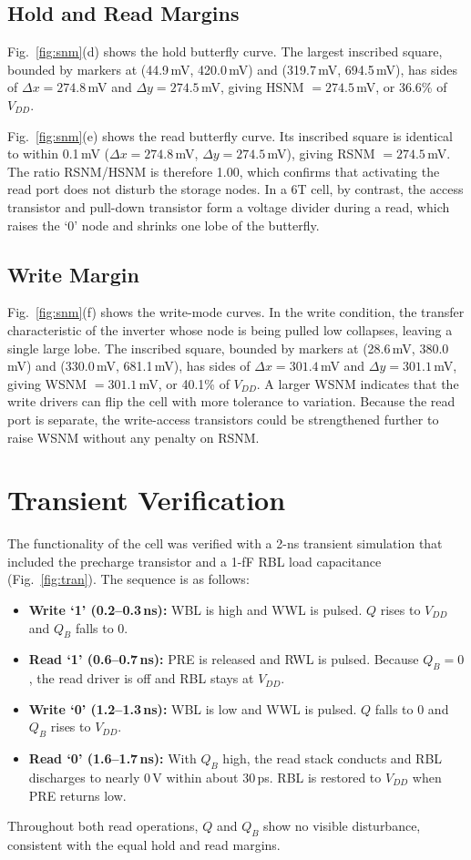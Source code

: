 \documentclass[conference]{IEEEtran}
\begin{document}
\subsection{Hold and Read Margins}
Fig.~\ref{fig:snm}(d) shows the hold butterfly curve. The largest inscribed square, bounded by markers at (44.9\,mV, 420.0\,mV) and (319.7\,mV, 694.5\,mV), has sides of $\Delta x = 274.8$\,mV and $\Delta y = 274.5$\,mV, giving HSNM $=274.5$\,mV, or 36.6\% of $V_{DD}$.

Fig.~\ref{fig:snm}(e) shows the read butterfly curve. Its inscribed square is identical to within 0.1\,mV ($\Delta x = 274.8$\,mV, $\Delta y = 274.5$\,mV), giving RSNM $=274.5$\,mV. The ratio RSNM/HSNM is therefore 1.00, which confirms that activating the read port does not disturb the storage nodes. In a 6T cell, by contrast, the access transistor and pull-down transistor form a voltage divider during a read, which raises the `0' node and shrinks one lobe of the butterfly.

\subsection{Write Margin}
Fig.~\ref{fig:snm}(f) shows the write-mode curves. In the write condition, the transfer characteristic of the inverter whose node is being pulled low collapses, leaving a single large lobe. The inscribed square, bounded by markers at (28.6\,mV, 380.0\,mV) and (330.0\,mV, 681.1\,mV), has sides of $\Delta x = 301.4$\,mV and $\Delta y = 301.1$\,mV, giving WSNM $=301.1$\,mV, or 40.1\% of $V_{DD}$. A larger WSNM indicates that the write drivers can flip the cell with more tolerance to variation. Because the read port is separate, the write-access transistors could be strengthened further to raise WSNM without any penalty on RSNM.

\section{Transient Verification}
The functionality of the cell was verified with a 2-ns transient simulation that included the precharge transistor and a 1-fF RBL load capacitance (Fig.~\ref{fig:tran}). The sequence is as follows:
\begin{itemize}
\item \textbf{Write `1' (0.2--0.3\,ns):} WBL is high and WWL is pulsed. $Q$ rises to $V_{DD}$ and $Q_B$ falls to 0.
\item \textbf{Read `1' (0.6--0.7\,ns):} PRE is released and RWL is pulsed. Because $Q_B=0$, the read driver is off and RBL stays at $V_{DD}$.
\item \textbf{Write `0' (1.2--1.3\,ns):} WBL is low and WWL is pulsed. $Q$ falls to 0 and $Q_B$ rises to $V_{DD}$.
\item \textbf{Read `0' (1.6--1.7\,ns):} With $Q_B$ high, the read stack conducts and RBL discharges to nearly 0\,V within about 30\,ps. RBL is restored to $V_{DD}$ when PRE returns low.
\end{itemize}
Throughout both read operations, $Q$ and $Q_B$ show no visible disturbance, consistent with the equal hold and read margins.
\end{document}

